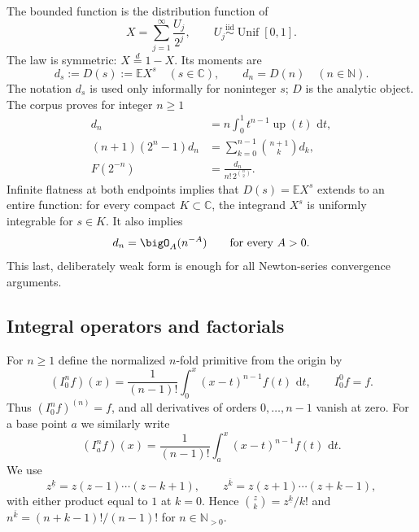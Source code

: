 \documentclass[11pt,oneside]{article}
\theoremstyle{definition}
\theoremstyle{remark}
\newcommand{\Up}{\operatorname{up}}
\newcommand{\E}{\mathbb E}
\newcommand{\C}{\mathbb C}
\newcommand{\N}{\mathbb N}
\newcommand{\dd}{\,\mathrm d}
\newcommand{\fall}[2]{#1^{\underline{#2}}}
\newcommand{\rise}[2]{#1^{\overline{#2}}}
\newcommand{\1}{\mathbf 1}
\begin{document}
The bounded function is the distribution function of
\begin{equation}
 X=\sum_{j=1}^{\infty}\frac{U_j}{2^j},
 \qquad U_j\stackrel{\mathrm{iid}}\sim\operatorname{Unif}[0,1].
 \label{p3:eq:X-random}
\end{equation}
The law is symmetric: $X\stackrel d=1-X$.  Its moments are
\begin{equation}
 d_s:=D(s):=\E X^s \quad(s\in\C),\qquad d_n=D(n)\quad(n\in\N).
 \label{p3:eq:D-def}
\end{equation}
The notation $d_s$ is used only informally for noninteger $s$; $D$ is the analytic object.
The corpus proves for integer $n\ge1$
\begin{align}
 d_n&=n\int_0^1t^{n-1}\Up(t)\,\dd t,                         \label{p3:eq:d-survival}\\
 (n+1)(2^n-1)d_n&=\sum_{k=0}^{n-1}\binom{n+1}{k}d_k,          \label{p3:eq:d-recurrence}\\
 F(2^{-n})&=\frac{d_n}{n!\,2^{\binom n2}}.                    \label{p3:eq:F-reciprocal}
\end{align}
Infinite flatness at both endpoints implies that $D(s)=\E X^s$ extends to an entire function:
for every compact $K\subset\C$, the integrand $X^s$ is uniformly integrable for $s\in K$.
It also implies
\begin{equation}
 d_n=\bigO_A(n^{-A})\qquad\text{for every }A>0.                \label{p3:eq:d-rapid}
\end{equation}
This last, deliberately weak form is enough for all Newton-series convergence arguments.

\subsection{Integral operators and factorials}

For $n\ge1$ define the normalized $n$-fold primitive from the origin by
\begin{equation}
 (I_0^nf)(x)=\frac1{(n-1)!}\int_0^x(x-t)^{n-1}f(t)\,\dd t,
 \qquad I_0^0f=f.                                             \label{p3:eq:I0n}
\end{equation}
Thus $(I_0^nf)^{(n)}=f$, and all derivatives of orders $0,\ldots,n-1$ vanish at zero.
For a base point $a$ we similarly write
\begin{equation}
 (I_a^nf)(x)=\frac1{(n-1)!}\int_a^x(x-t)^{n-1}f(t)\,\dd t.
 \label{p3:eq:Ian}
\end{equation}
We use
\begin{equation}
 \fall zk=z(z-1)\cdots(z-k+1),\qquad
 \rise zk=z(z+1)\cdots(z+k-1),                               \label{p3:eq:factorials}
\end{equation}
with either product equal to $1$ at $k=0$.  Hence
$\binom zk=\fall zk/k!$ and $\rise nk=(n+k-1)!/(n-1)!$ for $n\in\N_{>0}$.
\end{document}
